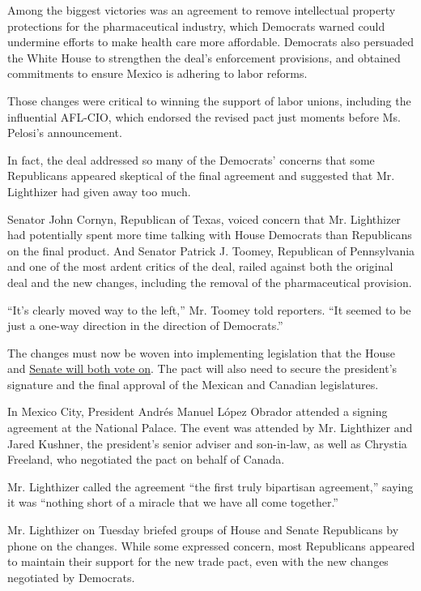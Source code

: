 Among the biggest victories was an agreement to remove intellectual
property protections for the pharmaceutical industry, which Democrats
warned could undermine efforts to make health care more affordable.
Democrats also persuaded the White House to strengthen the deal's
enforcement provisions, and obtained commitments to ensure Mexico is
adhering to labor reforms.

Those changes were critical to winning the support of labor unions,
including the influential AFL-CIO, which endorsed the revised pact just
moments before Ms. Pelosi's announcement.

In fact, the deal addressed so many of the Democrats' concerns that some
Republicans appeared skeptical of the final agreement and suggested that
Mr. Lighthizer had given away too much.

Senator John Cornyn, Republican of Texas, voiced concern that Mr.
Lighthizer had potentially spent more time talking with House Democrats
than Republicans on the final product. And Senator Patrick J. Toomey,
Republican of Pennsylvania and one of the most ardent critics of the
deal, railed against both the original deal and the new changes,
including the removal of the pharmaceutical provision.

``It's clearly moved way to the left,'' Mr. Toomey told reporters. ``It
seemed to be just a one-way direction in the direction of Democrats.''

The changes must now be woven into implementing legislation that the
House and
\href{https://www.nytimes.com/2020/01/16/us/politics/senate-usmca-approval-trump.html}{Senate
will both vote on}. The pact will also need to secure the president's
signature and the final approval of the Mexican and Canadian
legislatures.

In Mexico City, President Andrés Manuel López Obrador attended a signing
agreement at the National Palace. The event was attended by Mr.
Lighthizer and Jared Kushner, the president's senior adviser and
son-in-law, as well as Chrystia Freeland, who negotiated the pact on
behalf of Canada.

Mr. Lighthizer called the agreement ``the first truly bipartisan
agreement,'' saying it was ``nothing short of a miracle that we have all
come together.''

Mr. Lighthizer on Tuesday briefed groups of House and Senate Republicans
by phone on the changes. While some expressed concern, most Republicans
appeared to maintain their support for the new trade pact, even with the
new changes negotiated by Democrats.

